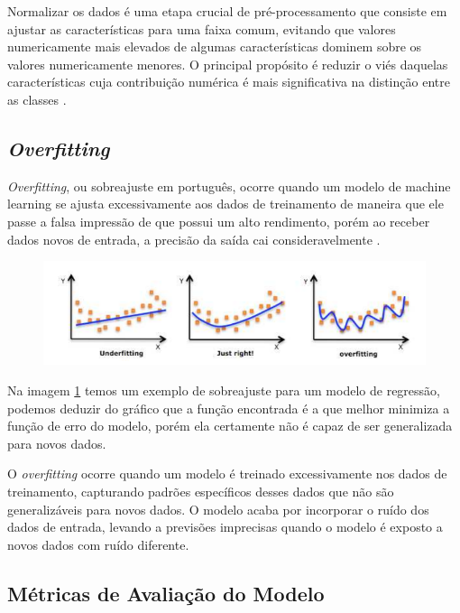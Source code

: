 Normalizar os dados é uma etapa crucial de pré-processamento que consiste em ajustar as características para uma faixa comum, evitando que valores numericamente mais elevados de algumas características dominem sobre os valores numericamente menores. O principal propósito é reduzir o viés daquelas características cuja contribuição numérica é mais significativa na distinção entre as classes \cite{SINGH2020105524}.

\subsection{\textbf{\textit{Overfitting}}}

\textit{Overfitting}, ou sobreajuste em português, ocorre quando um modelo de machine learning se ajusta excessivamente aos dados de treinamento de maneira que ele passe a falsa impressão de que possui um alto rendimento, porém ao receber dados novos de entrada, a precisão da saída cai consideravelmente \cite{overftt}.

\begin{figure}[htb]
	\centering
	\begin{minipage}{0.9\linewidth}
		\centering
		\includegraphics[width=\linewidth]{tg1/figuras/overfiting.png}
		\caption{
            \cite{overftt}} \label{fig:overftt}
	\end{minipage}
\end{figure}

Na imagem \ref{fig:overftt} temos um exemplo de sobreajuste para um modelo de regressão, podemos deduzir do gráfico que a função encontrada é a que melhor minimiza a função de erro do modelo, porém ela certamente não é capaz de ser generalizada para novos dados.

O \textit{overfitting} ocorre quando um modelo é treinado excessivamente nos dados de treinamento, capturando padrões específicos desses dados que não são generalizáveis para novos dados. O modelo acaba por incorporar o ruído dos dados de entrada, levando a previsões imprecisas quando o modelo é exposto a novos dados com ruído diferente.

\subsection{\textbf{Métricas de Avaliação do Modelo}}

